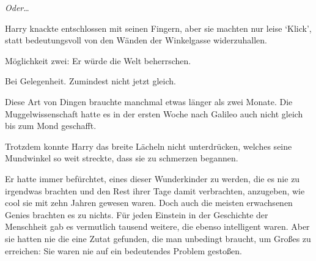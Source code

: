 \emph{Oder}…

Harry knackte entschlossen mit seinen Fingern, aber sie machten nur leise ‘Klick’, statt bedeutungsvoll von den Wänden der Winkelgasse widerzuhallen.

Möglichkeit zwei: Er würde die Welt beherrschen.

Bei Gelegenheit. Zumindest nicht jetzt gleich.

Diese Art von Dingen brauchte manchmal etwas länger als zwei Monate. Die Muggelwissenschaft hatte es in der ersten Woche nach Galileo auch nicht gleich bis zum Mond geschafft.

Trotzdem konnte Harry das breite Lächeln nicht unterdrücken, welches seine Mundwinkel so weit streckte, dass sie zu schmerzen begannen.

Er hatte immer befürchtet, eines dieser Wunderkinder zu werden, die es nie zu irgendwas brachten und den Rest ihrer Tage damit verbrachten, anzugeben, wie cool sie mit zehn Jahren gewesen waren. Doch auch die meisten erwachsenen Genies brachten es zu nichts. Für jeden Einstein in der Geschichte der Menschheit gab es vermutlich tausend weitere, die ebenso intelligent waren. Aber sie hatten nie die eine Zutat gefunden, die man unbedingt braucht, um Großes zu erreichen: Sie waren nie auf ein bedeutendes Problem gestoßen.

